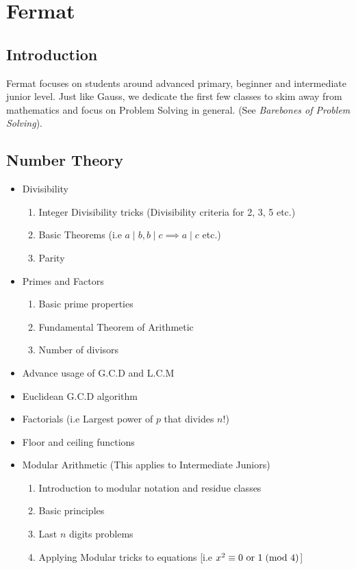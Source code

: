 \documentclass[oneside]{book}
\begin{document}
\chapter{Fermat}
\section{Introduction}
    Fermat focuses on students around advanced primary, beginner and intermediate junior level.
    Just like Gauss, we dedicate the first few classes to skim away from mathematics and focus on Problem Solving in general. (See \emph{Barebones of Problem Solving}).
    
\section{Number Theory}
\begin{itemize}
  \item Divisibility
    \begin{enumerate}
      \item Integer Divisibility tricks (Divisibility criteria for 2, 3, 5 etc.)
      \item Basic Theorems (i.e $a \mid b, b \mid c \implies a \mid c$ etc.)
      \item Parity
  \end{enumerate}
  \item Primes and Factors
    \begin{enumerate}
      \item Basic prime properties
      \item Fundamental Theorem of Arithmetic
      \item Number of divisors
  \end{enumerate}
  \item Advance usage of G.C.D and L.C.M
  \item Euclidean G.C.D algorithm
  \item Factorials (i.e Largest power of $p$ that divides $n!$)
  \item Floor and ceiling functions
  \item Modular Arithmetic (This applies to Intermediate Juniors)
    \begin{enumerate}
      \item Introduction to modular notation and residue classes
      \item Basic principles
      \item Last $n$ digits problems
      \item Applying Modular tricks to equations [i.e $x^2 \equiv 0 \text{ or } 1 \hspace{1mm}(\text{mod } 4)$]
  \end{enumerate}
\end{itemize}
\end{document}
